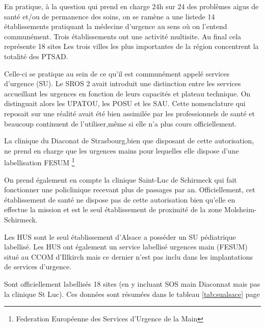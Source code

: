 \documentclass[12pt,english,french,twoside]{report}\usepackage[]{graphicx}\usepackage[]{color}
\begin{document}
En pratique, à la question qui prend en charge 24h sur 24 des problèmes aigus de santé et/ou de permanence des soins, on se ramène a une listede 14 établissements pratiquant la médecine d'urgence au sens où on l'entend communément. Trois établissements ont une activité multisite. Au final cela représente 18 sites Les trois villes les plus importantes de la région concentrent la totalité des PTSAD.

Celle-ci se pratique au sein de ce qu'il est communément appelé services d'urgence (SU). Le SROS 2 avait introduit une distinction entre les services accueillant les urgences en fonction de leurs capacités et plateau technique. On distinguait alors les UPATOU, les POSU et les SAU. Cette nomenclature qui reposait sur une réalité avait été bien assimilée par les professionnels de santé et beaucoup continuent de l'utiliser,même si elle n'a plus cours officiellement. 

La clinique du Diaconat de Strasbourg,bien que disposant de cette autorisation, ne prend en charge que les urgences mains pour lequelles elle dispose d'une labellisation FESUM \footnote{Federation Européenne des Services d'Urgence de la Main}

On prend également en compte la clinique Saint-Luc de Schirmeck qui fait fonctionner une policlinique recevant plus de  passages par an. Officiellement, cet établissement de santé ne dispose pas de cette autorisation bien qu'elle en effectue la mission et est le seul établissement de proximité de la zone Molsheim-Schirmeck.

Les HUS sont le seul établissement d'Alsace a posséder un SU pédiatrique labellisé. Les HUS ont également un service labellisé urgences main (FESUM) situé au CCOM d'Illkirch mais ce dernier n'est pas inclu dans les implantations de services d'urgence.

Sont officiellement labellisés 18 sites (en y incluant SOS main Diaconnat mais pas la clinique St Luc). Ces données sont résumées dans le tableau \ref{tab:sualsace} page \pageref{tab:sualsace}
\end{document}
